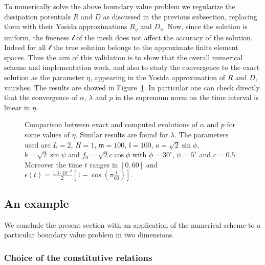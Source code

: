 \documentclass[a4paper,10pt,twoside]{amsbook}
\numberwithin{section}{chapter}
\numberwithin{equation}{chapter}
\theoremstyle{definition}
\begin{document}
To numerically solve the above boundary value problem we regularize the dissipation potentials  $R$ and $D$ as discussed in the previous subsection, replacing them with their Yosida approximations $R_\eta$ and $D_\eta$. Now, since the solution is uniform, the fineness $\mathscr{l}$ of the mesh does not affect the accuracy of the solution. Indeed for all $\mathscr{l}$ the true solution belongs to the approximate finite element spaces. Thus the aim of this validation is to show that the overall numerical scheme and implementation work, and also to study the convergence to the exact solution as the parameter $\eta$, appearing in the Yosida approximation of $R$ and $D$, vanishes. The results are showed in Figure~\ref{fig:eta-to-zero}. In particular one can check directly that the convergence of $\alpha$, $\lambda$ and $p$ in the supremum norm on the time interval is linear in $\eta$.
\begin{figure}[htp]
\centering

\;

\caption{Comparison between exact and computed evolutions of $\alpha$ and $p$ for some values of $\eta$. Similar results are found for $\lambda$. The parameters used are $L=2$, $H=1$, $\mathfrak{m}=100$, $\mathfrak{l}=100$, $a=\sqrt{2}\sin\phi$, $b=\sqrt{2}\sin\psi$ and $f_0=\sqrt{2}c\cos\phi$ with $\phi=30^\circ$, $\psi=5^\circ$ and $c=0.5$. Moreover the time $t$ ranges in $[0,60]$ and $\epsilon(t)=\frac{1.3\cdot 10^{-2}}{2}\left[1-\cos\left(\pi\frac{t}{60}\right)\right]$.}
\label{fig:eta-to-zero}
\end{figure}

\subsection{An example}
\label{subsec:numerical-example}

We conclude the present section with an application of the numerical scheme to a particular boundary value problem in two dimensions.

\subsubsection*{Choice of the constitutive relations}
\end{document}
